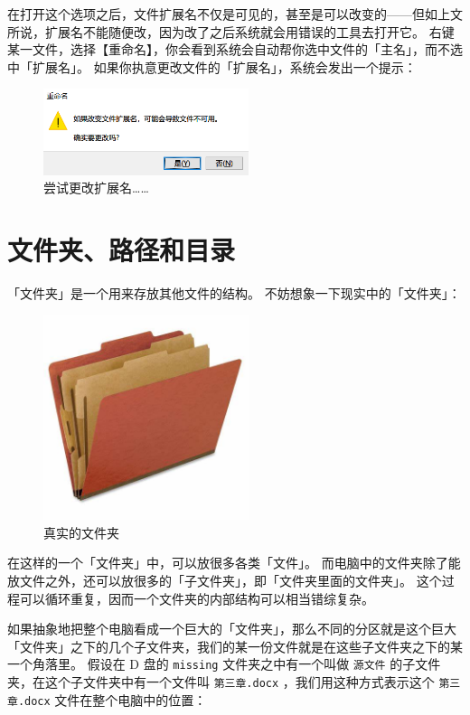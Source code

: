 在打开这个选项之后，文件扩展名不仅是可见的，甚至是可以改变的——但如上文所说，扩展名不能随便改，因为改了之后系统就会用错误的工具去打开它。
右键某一文件，选择【重命名】，你会看到系统会自动帮你选中文件的「主名」，而不选中「扩展名」。
如果你执意更改文件的「扩展名」，系统会发出一个提示：

\begin{figure}[htb!]
  \centering
  \includegraphics[width=6cm]{assets/Warning_of_Changing_Ext.png}
  \caption{尝试更改扩展名……}
  \label{Warning_of_Changing_Ext}
\end{figure}

\section{文件夹、路径和目录}

「文件夹」是一个用来存放其他文件的结构。
不妨想象一下现实中的「文件夹」：

\begin{figure}[htb!]
  \centering
  \includegraphics[width=6cm]{assets/Real_Folder.png}
  \caption{真实的文件夹}
  \label{Real_Folder}
\end{figure}

在这样的一个「文件夹」中，可以放很多各类「文件」。
而电脑中的文件夹除了能放文件之外，还可以放很多的「子文件夹」，即「文件夹里面的文件夹」。
这个过程可以循环重复，因而一个文件夹的内部结构可以相当错综复杂。

如果抽象地把整个电脑看成一个巨大的「文件夹」，那么不同的分区就是这个巨大「文件夹」之下的几个子文件夹，我们的某一份文件就是在这些子文件夹之下的某一个角落里。
假设在 D 盘的 \verb|missing| 文件夹之中有一个叫做 \verb|源文件| 的子文件夹，在这个子文件夹中有一个文件叫 \verb|第三章.docx| ，我们用这种方式表示这个 \verb|第三章.docx| 文件在整个电脑中的位置：

